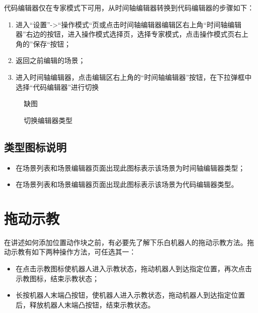 代码编辑器仅在专家模式下可用，从时间轴编辑器转换到代码编辑器的步骤如下：
\begin{enumerate}
\item 进入“设置”->“操作模式“页或点击时间轴编辑器编辑区右上角“时间轴编辑器”右边的按钮，进入操作模式选择页，选择专家模式，点击操作模式页右上角的”保存“按钮；
\item 返回之前编辑的场景；
\item 进入时间轴编辑器，点击编辑区右上角的“时间轴编辑器”按钮，在下拉弹框中选择“代码编辑器”进行切换
\end{enumerate}

\begin{figure}[ht]
	\centering
	\color{red}缺图
	\caption{切换编辑器类型}
	\label{fig:切换编辑器类型}
\end{figure}


\subsection{类型图标说明}
\begin{itemize}
	\item[\icn{image/43.pdf}] 在场景列表和场景编辑器页面出现此图标表示该场景为时间轴编辑器类型；
	\item[\icn{image/44.pdf}] 在场景列表和场景编辑器页面出现此图标表示该场景为代码编辑器类型。
\end{itemize}

\section{拖动示教}
在讲述如何添加位置动作块之前，有必要先了解下乐白机器人的拖动示教方法。拖动示教有如下两种操作方法，可任选其一：
\begin{itemize}
	\item 在\LM 点击示教图标使机器人进入示教状态，拖动机器人到达指定位置，再次点击示教图标，结束示教状态；
	\item 长按机器人末端凸按钮，使机器人进入示教状态，拖动机器人到达指定位置后，释放机器人末端凸按钮，结束示教状态。
\end{itemize}



